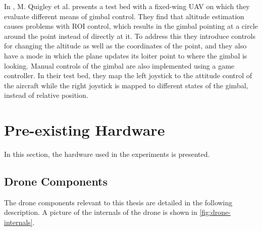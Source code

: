 \documentclass[nofilelist]{cslthse-msc}
\begin{document}
In \cite{targetting}, M. Quigley et al. presents a test bed with a fixed-wing UAV on which they evaluate different means of gimbal control. They find that altitude estimation causes problems with ROI control, which results in the gimbal pointing at a circle around the point instead of directly at it. To address this they introduce controls for changing the altitude as well as the coordinates of the point, and they also have a mode in which the plane updates its loiter point to where the gimbal is looking. Manual controls of the gimbal are also implemented using a game controller. In their test bed, they map the left joystick to the attitude control of the aircraft while the right joystick is mapped to different states of the gimbal, instead of relative position.

\section{Pre-existing Hardware}
In this section, the hardware used in the experiments is presented.

\subsection{Drone Components}
\label{sec:uav-components}
The drone components relevant to this thesis are detailed in the following description. A picture of the internals of the drone is shown in \ref{fig:drone-internals}.
\end{document}
